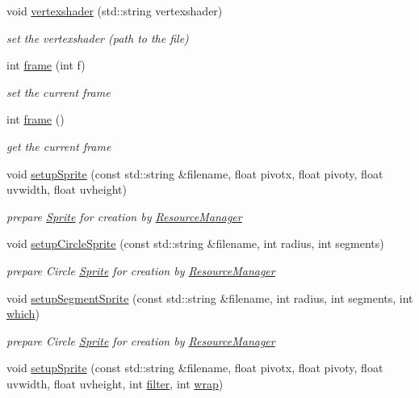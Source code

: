 \begin{DoxyCompactItemize}
void \hyperlink{class_sprite_ac5271cb1c478761a433969f03699894c}{vertexshader} (std\+::string vertexshader)
\begin{DoxyCompactList}\small\item\em set the vertexshader (path to the file) \end{DoxyCompactList}\item 
int \hyperlink{class_sprite_a150a85459279f9ef94eac9376736cab0}{frame} (int f)
\begin{DoxyCompactList}\small\item\em set the current frame \end{DoxyCompactList}\item 
int \hyperlink{class_sprite_a59437773b51f5c9abba5c8dabd2fbdb4}{frame} ()
\begin{DoxyCompactList}\small\item\em get the current frame \end{DoxyCompactList}\item 
void \hyperlink{class_sprite_afd130a4d3383e9d9c53048e282e3fb27}{setup\+Sprite} (const std\+::string \&filename, float pivotx, float pivoty, float uvwidth, float uvheight)
\begin{DoxyCompactList}\small\item\em prepare \hyperlink{class_sprite}{Sprite} for creation by \hyperlink{class_resource_manager}{Resource\+Manager} \end{DoxyCompactList}\item 
void \hyperlink{class_sprite_a4fb77e0618b77634c172edbc203549d3}{setup\+Circle\+Sprite} (const std\+::string \&filename, int radius, int segments)
\begin{DoxyCompactList}\small\item\em prepare Circle \hyperlink{class_sprite}{Sprite} for creation by \hyperlink{class_resource_manager}{Resource\+Manager} \end{DoxyCompactList}\item 
void \hyperlink{class_sprite_a9221cee6ad17032a77edb060cbca8ae7}{setup\+Segment\+Sprite} (const std\+::string \&filename, int radius, int segments, int \hyperlink{class_sprite_a0bfc3bb83da3bef06696cb55b5c47465}{which})
\begin{DoxyCompactList}\small\item\em prepare Circle \hyperlink{class_sprite}{Sprite} for creation by \hyperlink{class_resource_manager}{Resource\+Manager} \end{DoxyCompactList}\item 
void \hyperlink{class_sprite_a9d55a71e8a3d02936392535fece67c31}{setup\+Sprite} (const std\+::string \&filename, float pivotx, float pivoty, float uvwidth, float uvheight, int \hyperlink{class_sprite_a02160c2a56ce86d59b827899bab9c5b5}{filter}, int \hyperlink{class_sprite_a0e10957a274ba27a38601eac1fda210c}{wrap})

\end{DoxyCompactItemize}
